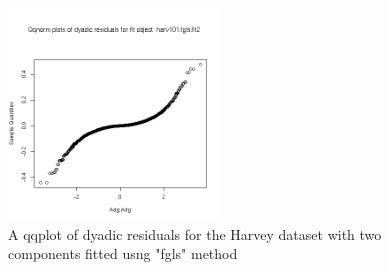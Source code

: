 %

\begin{figure}[h]
  \centering
  \includegraphics[width=0.5\textwidth]{harv101fig2.png}
  \caption{A qqplot of dyadic residuals for the Harvey dataset
           with two components fitted usng "fgls" method}
  \label{fig:2}
\end{figure}

%

